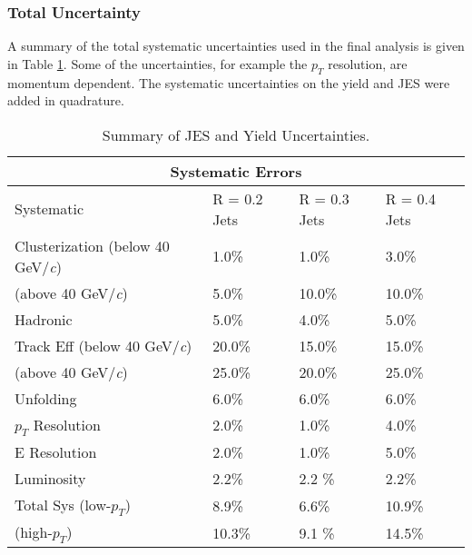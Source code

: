 \subsubsection{Total Uncertainty}

A summary of the total systematic uncertainties used in the final analysis is given in Table \ref{table:1}.  Some of the uncertainties, for example the $p_{T}$ resolution, are momentum dependent.  The systematic uncertainties on the yield and JES were added in quadrature.
\newline

\begin{table}[h!]
\centering
\caption{Summary of JES and Yield Uncertainties.}
\begin{tabular}{ |p{5cm}||p{3cm}|p{3cm}|p{3cm}|  }
 \hline
 \multicolumn{4}{|c|}{Systematic Errors} \\
 \hline
 Systematic &R = 0.2 Jets & R = 0.3 Jets& R = 0.4 Jets\\
 \hline
Clusterization (below 40 GeV/\textit{c}) & 1.0\%    &1.0\%&  3.0\%\\
 (above 40 GeV/\textit{c})           &  5.0\%  & 10.0\%   &  10.0\%\\
Hadronic &   5.0\% & 4.0\% & 5.0\%\\
Track Eff (below 40 GeV/\textit{c})&20.0\% & 15.0\% & 15.0\%\\
 (above 40 GeV/\textit{c})            &  25.0\%  & 20.0\%   &  25.0\%\\
Unfolding & 6.0\% & 6.0\%&  6.0\%\\
$p_{T}$ Resolution & 2.0\% & 1.0\% & 4.0\%\\
E Resolution& 2.0\%   &1.0\% & 5.0\%\\
Luminosity & 2.2\%  & 2.2 \% & 2.2\%\\
 \hline
 \hline
Total Sys (low-$p_{T}$) & 8.9\%  & 6.6\% & 10.9\%\\
(high-$p_{T}$) & 10.3\%  & 9.1 \% & 14.5\%\\
\hline
\end{tabular}

\label{table:1}
\end{table}



